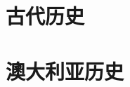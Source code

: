 \documentclass[UTF8]{../RepresentationUniverse}
\begin{document}
\section{古代历史}
\section{澳大利亚历史}
\end{document}
